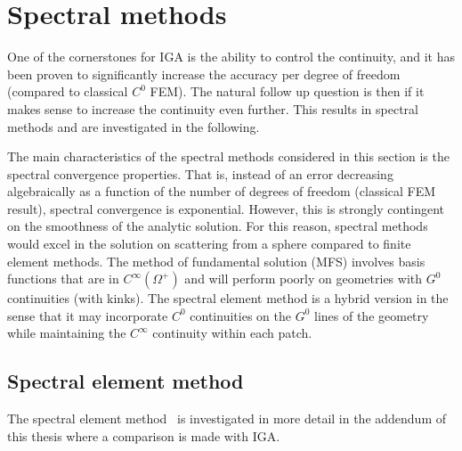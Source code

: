 \section{Spectral methods}
One of the cornerstones for IGA is the ability to control the continuity, and it has been proven to significantly increase the accuracy per degree of freedom (compared to classical $C^0$ FEM). The natural follow up question is then if it makes sense to increase the continuity even further. This results in spectral methods and are investigated in the following.

The main characteristics of the spectral methods considered in this section is the spectral convergence properties. That is, instead of an error decreasing algebraically as a function of the number of degrees of freedom (classical FEM result), spectral convergence is exponential. However, this is strongly contingent on the smoothness of the analytic solution. For this reason, spectral methods would excel in the solution on scattering from a sphere compared to finite element methods. The method of fundamental solution (MFS) involves basis functions that are in $C^\infty(\Omega^+)$ and will perform poorly on geometries with $G^0$ continuities (with kinks). The spectral element method is a hybrid version in the sense that it may incorporate $C^0$ continuities on the $G^0$ lines of the geometry while maintaining the $C^\infty$ continuity within each patch.

\subsection{Spectral element method}
The spectral element method~\cite{Patera1984ase} is investigated in more detail in the addendum of this thesis where a comparison is made with IGA.

